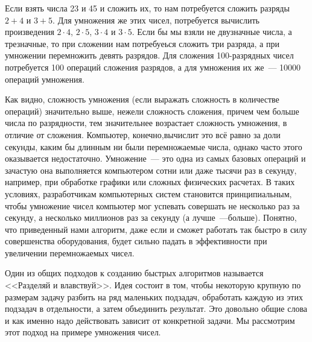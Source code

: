 Если взять числа 23 и 45 и сложить их, то нам потребуется сложить разряды $2+4$ и $3+5$. Для умножения же этих чисел, потребуется вычислить произведения $2\cdot 4$, $2\cdot 5$, $3\cdot 4$ и $3\cdot 5$. Если бы мы взяли не двузначные числа, а трезначные, то при сложении нам потребуеься сложить три разряда, а при умножении перемножить девять разрядов. Для сложения 100-разрядных чисел потребуется 100 операций сложения разрядов, а для умножения их же~--- 10000 операций умножения.

Как видно, сложность умножения (если выражать сложность в количестве операций)  значительно выше, нежели сложность сложения, причем чем больше числа по разрядности, тем значительнее возрастает сложность умножения, в отличие от сложения. Компьютер, конечно,вычислит это всё равно за доли секунды, каким бы длинным ни были перемножаемые числа, однако часто этого оказывается недостаточно. Умножение~--- это одна из самых базовых операций и зачастую она выполняется компьютером сотни или даже тысячи раз в секунду, например, при обработке графики или сложных физических расчетах. В таких условиях, разработчикам компьютерных систем становится принципиальным, чтобы умножение чисел компьютер мог успевать совершать не несколько раз за секунду, а несколько миллионов раз за секунду (а лучше~---больше). Понятно, что приведенный нами алгоритм, даже если и сможет работать так быстро в силу совершенства оборудования, будет сильно падать в эффективности при увеличении перемножаемых чисел.

Один из общих подходов к созданию быстрых алгоритмов называется <<Разделяй и влавствуй>>. Идея состоит в том, чтобы некоторую крупную по размерам задачу разбить на ряд маленьких подзадач, обработать каждую из этих подзадач в отдельности, а затем объединить результат. Это довольно общие слова и как именно надо действовать зависит от конкретной задачи. Мы рассмотрим этот подход на примере умножения чисел.

